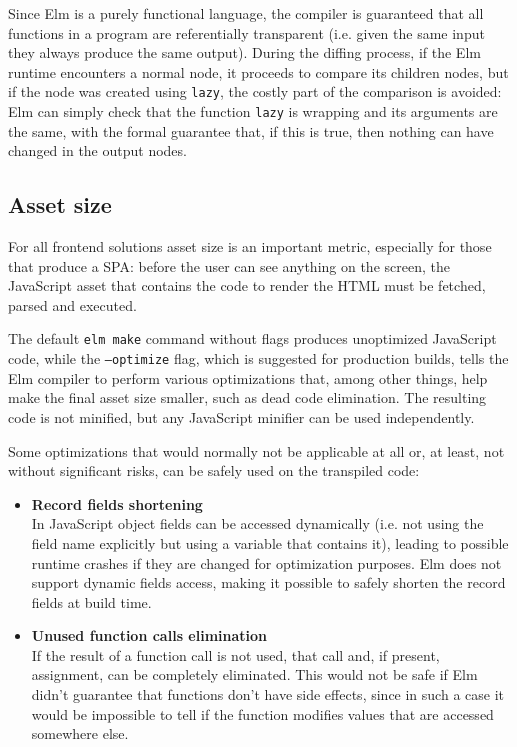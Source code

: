 Since Elm is a purely functional language, the compiler is guaranteed that all functions in a program are referentially transparent (i.e. given the same input they always produce the same output). During the diffing process, if the Elm runtime encounters a normal node, it proceeds to compare its children nodes, but if the node was created using \texttt{lazy}, the costly part of the comparison is avoided: Elm can simply check that the function \texttt{lazy} is wrapping and its arguments are the same, with the formal guarantee that, if this is true, then nothing can have changed in the output nodes.

\subsection{Asset size}
For all frontend solutions asset size is an important metric, especially for those that produce a SPA: before the user can see anything on the screen, the JavaScript asset that contains the code to render the HTML must be fetched, parsed and executed.

The default \texttt{elm make} command without flags produces unoptimized JavaScript code, while the \texttt{--optimize} flag, which is suggested for production builds, tells the Elm compiler to perform various optimizations that, among other things, help make the final asset size smaller, such as dead code elimination. The resulting code is not minified, but any JavaScript minifier can be used independently. \cite{noauthor_minification_nodate}

Some optimizations that would normally not be applicable at all or, at least, not without significant risks, can be safely used on the transpiled code:
\begin{itemize}
    \item \textbf{Record fields shortening}\\In JavaScript object fields can be accessed dynamically (i.e. not using the field name explicitly but using a variable that contains it), leading to possible runtime crashes if they are changed for optimization purposes. Elm does not support dynamic fields access, making it possible to safely shorten the record fields at build time.
    \item \textbf{Unused function calls elimination}\\If the result of a function call is not used, that call and, if present, assignment, can be completely eliminated. This would not be safe if Elm didn't guarantee that functions don't have side effects, since in such a case it would be impossible to tell if the function modifies values that are accessed somewhere else.
\end{itemize}
